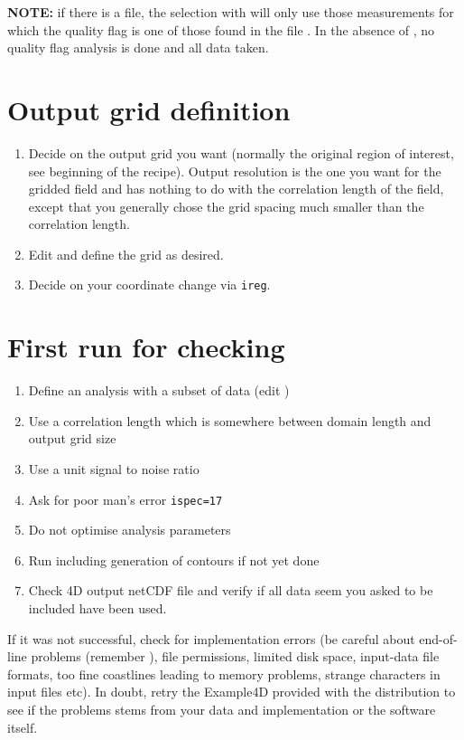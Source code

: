 \documentclass[a4paper,12pt,oneside,notitlepage]{book}
\newcommand{\file}[1]{\texttt{\color{MidnightBlue}{#1}}}
\newcommand{\command}[1]{\texttt{\color{RedOrange}{#1}}}
\begin{document}
{\bf NOTE:} if there is a \file{qflist} file, the selection with \command{divaselectorODV4} will only use those measurements for which the quality flag is one of those found in the file \file{qflist}. In the absence of \file{qflist}, no quality flag analysis is done and all data taken.
 


\section{Output grid definition}

\begin{enumerate}
\item
Decide on the output grid you want (normally the original region of interest, see beginning of the recipe). Output resolution is the one you want for the gridded field and has nothing to do with the correlation length of the field, except that you generally chose the grid spacing much smaller than the correlation length.
\item Edit \file{param.par} and define the grid as desired.
\item Decide on your coordinate change via {\tt ireg}.
\end{enumerate}


\section{First run for checking}
\begin{enumerate}
\item Define an analysis with a subset of data (edit \file{yearlist, monthlist, varlist})
\item Use a correlation length which is somewhere between domain length and output grid size
\item Use a unit signal to noise ratio
\item Ask for poor man's error {\tt ispec=17}
\item Do not optimise analysis parameters
\item Run \command{divadoall} including generation of contours if not yet done
\item Check 4D output netCDF file and verify if all data seem you asked to be included have been used.
\end{enumerate}
If it was not successful, check for implementation errors (be careful about end-of-line problems (remember \command{dos2unix}), file permissions, limited disk space, input-data file formats, too fine coastlines leading to memory problems, strange characters in input files etc). In doubt, retry the Example4D provided with the distribution to see if the problems stems from your data and implementation or the software itself.
\end{document}
